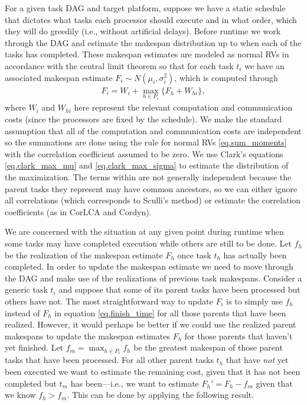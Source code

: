\documentclass[12pt]{article}
\begin{document}
For a given task DAG and target platform, suppose we have a static schedule that dictates what tasks each processor should execute and in what order, which they will do greedily (i.e., without artificial delays). Before runtime we work through the DAG and estimate the makespan distribution up to when each of the tasks has completed. These makespan estimates are modeled as normal RVs in accordance with the central limit theorem so that for each task $t_i$ we have an associated makespan estimate $F_i \sim N(\mu_i, \sigma_i^2)$, which is computed through  
\begin{align}
F_i = W_i + \max_{h \in P_i} \{ F_h + W_{hi} \}, \label{eq.finish_time}
\end{align} 
where $W_i$ and $W_{hi}$ here represent the relevant computation and communication costs (since the processors are fixed by the schedule). We make the standard assumption that all of the computation and communication costs are independent so the summations are done using the rule for normal RVs \eqref{eq.sum_moments} with the correlation coefficient assumed to be zero. We use Clark's equations \eqref{eq.clark_max_mu} and \eqref{eq.clark_max_sigma} to estimate the distribution of the maximization. The terms within are not generally independent because the parent tasks they represent may have common ancestors, so we can either ignore all correlations (which corresponds to Sculli's method) or estimate the correlation coefficients (as in CorLCA and Cordyn). 

We are concerned with the situation at any given point during runtime when some tasks may have completed execution while others are still to be done. Let $f_h$ be the realization of the makespan estimate $F_h$ once task $t_h$ has actually been completed. In order to update the makespan estimate we need to move through the DAG and make use of the realizations of previous task makespans. Consider a generic task $t_i$ and suppose that some of its parent tasks have been processed but others have not. The most straightforward way to update $F_i$ is to simply use $f_h$ instead of $F_h$ in equation \eqref{eq.finish_time} for all those parents that have been realized. However, it would perhaps be better if we could use the realized parent makespans to update the makespan estimates $F_h$ for those parents that haven't yet finished. Let $f_m = \max_{h \in P_i} f_h$ be the greatest makespan of those parent tasks that have been processed. For all other parent tasks $t_h$ that have {\em not} yet been executed we want to estimate the remaining cost, given that it has not been completed but $t_m$ has been---i.e., we want to estimate $F_h' = F_h - f_m$ given that we know $f_h > f_m$. This can be done by applying the following result. 
\end{document}
